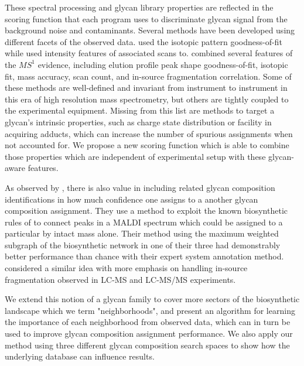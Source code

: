 These spectral processing and glycan library properties are reflected in the
scoring function that each program uses to discriminate glycan signal from
the background noise and contaminants. Several methods have been developed
using different facets of the observed data. \cite{Yu2013} used the isotopic pattern
goodness-of-fit while \cite{Peltoniemi2013} used intensity features
of associated \msn scans to. \cite{Kronewitter2014} combined several features of the
$MS^1$ evidence, including elution profile peak shape goodness-of-fit, isotopic fit,
mass accuracy, scan count, and in-source fragmentation correlation. Some of these methods
are well-defined and invariant from instrument to instrument in this era of high resolution
mass spectrometry, but others are tightly coupled to the experimental equipment. Missing from
this list are methods to target a glycan's intrinsic properties, such as charge state distribution
or facility in acquiring adducts, which can increase the number of spurious assignments when not
accounted for. We propose a new scoring function which is able to combine those properties which
are independent of experimental setup with these glycan-aware features.

As observed by \cite{Goldberg2009}, there is also value in including related glycan
composition identifications in how much confidence one assigns to a another glycan
composition assignment. They use a method to exploit the known biosynthetic rules of
\nglycans to connect peaks in a MALDI spectrum which could be assigned to a particular \nglycan by
intact mass alone. Their method using the maximum weighted subgraph of the biosynthetic
network in one of their three had demonstrably better performance than chance with
their expert system annotation method. \cite{Kronewitter2014} considered a similar idea with
more emphasis on handling in-source fragmentation observed in LC-MS and LC-MS/MS experiments.

We extend this notion of a glycan family to cover more sectors of the biosynthetic
landscape which we term "neighborhoods", and present an algorithm for learning the
importance of each neighborhood from observed data, which can in turn be used to
improve glycan composition assignment performance. We also apply our method using
three different glycan composition search spaces to show how the underlying database
can influence results.
